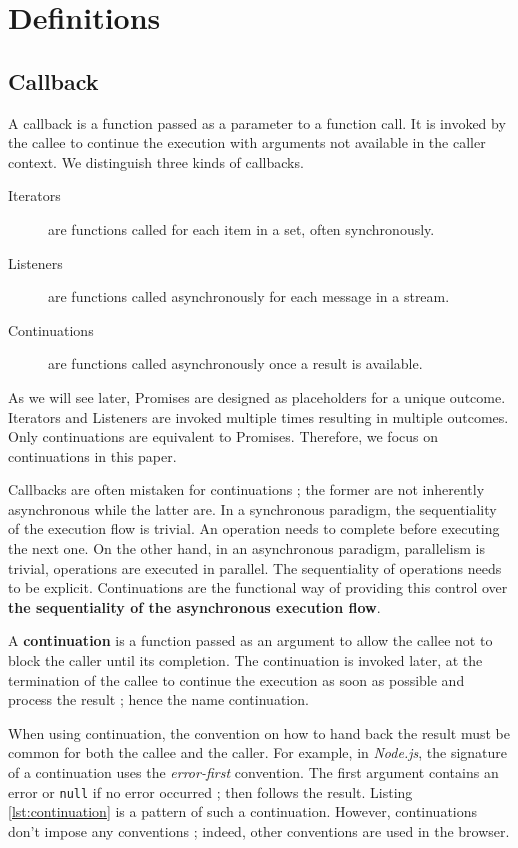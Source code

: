 \section{Definitions} \label{section:definitions}

\subsection{Callback} \label{section:definitions:continuation}

A callback is a function passed as a parameter to a function call.
It is invoked by the callee to continue the execution with arguments not available in the caller context.
We distinguish three kinds of callbacks.

\begin{description}
  \item[Iterators] are functions called for each item in a set, often synchronously.
  \item[Listeners] are functions called asynchronously for each message in a stream.
  \item[Continuations] are functions called asynchronously once a result is available.
\end{description}

As we will see later, Promises are designed as placeholders for a unique outcome.
Iterators and Listeners are invoked multiple times resulting in multiple outcomes.
Only continuations are equivalent to Promises.
Therefore, we focus on continuations in this paper.

Callbacks are often mistaken for continuations ; the former are not inherently asynchronous while the latter are.
In a synchronous paradigm, the sequentiality of the execution flow is trivial.
An operation needs to complete before executing the next one.
On the other hand, in an asynchronous paradigm, parallelism is trivial, operations are executed in parallel.
The sequentiality of operations needs to be explicit.
Continuations are the functional way of providing this control over \textbf{the sequentiality of the asynchronous execution flow}.

A \textbf{continuation} is a function passed as an argument to allow the callee not to block the caller until its completion.
The continuation is invoked later, at the termination of the callee to continue the execution as soon as possible and process the result ; hence the name continuation.

When using continuation, the convention on how to hand back the result must be common for both the callee and the caller.
For example, in \textit{Node.js}, the signature of a continuation uses the \textit{error-first} convention.
The first argument contains an error or \texttt{null} if no error occurred ; then follows the result.
Listing \ref{lst:continuation} is a pattern of such a continuation.
However, continuations don't impose any conventions ; indeed, other conventions are used in the browser.

